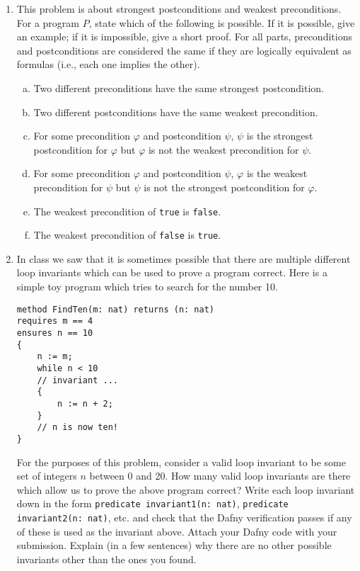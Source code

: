\documentclass{article}
\begin{document}
\begin{enumerate}
\begin{enumerate}
\end{enumerate}

\item
This problem is about strongest postconditions and weakest preconditions.
For a program $P$, state which of the following is possible.
If it is possible, give an example;
if it is impossible, give a short proof.
For all parts, preconditions and postconditions are considered the same if they are
logically equivalent as formulas (i.e., each one implies the other).

\begin{enumerate}[(a)]
\item
Two different preconditions have the same strongest postcondition.
\item
Two different postconditions have the same weakest precondition.
\item For some precondition $\varphi$ and postcondition $\psi$, $\psi$ is the strongest postcondition for $\varphi$ but $\varphi$ is not the weakest precondition for $\psi$.
\item For some precondition $\varphi$ and postcondition $\psi$,
$\varphi$ is the weakest precondition for $\psi$ but $\psi$ is not the strongest postcondition for $\varphi$.
\item
The weakest precondition of \texttt{true} is \texttt{false}.
\item
The weakest precondition of \texttt{false} is \texttt{true}.
\end{enumerate}

\item
In class we saw that it is sometimes possible that there are multiple different loop invariants
which can be used to prove a program correct.
Here is a simple toy program which tries to search for the number 10.
\begin{verbatim}
method FindTen(m: nat) returns (n: nat)
requires m == 4
ensures n == 10
{
    n := m;
    while n < 10
    // invariant ...
    {
        n := n + 2;
    }
    // n is now ten!
}
\end{verbatim}

For the purposes of this problem, consider a valid loop invariant to be some set of integers
$n$ between 0 and 20.
How many valid loop invariants are there which allow us to prove the above program correct?
Write each loop invariant down in the form \texttt{predicate invariant1(n: nat)}, \texttt{predicate invariant2(n: nat)}, etc. and check that the Dafny verification passes if any of these
is used as the invariant above.
Attach your Dafny code with your submission.
Explain (in a few sentences) why there are no other possible invariants other than the ones you found.


\end{enumerate}
\end{document}
